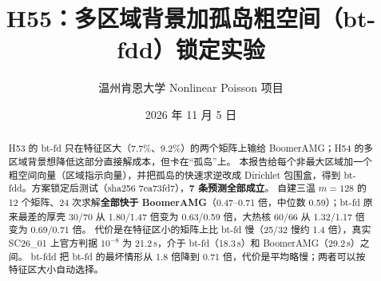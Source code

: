 \documentclass[11pt,a4paper]{ctexart}
\title{H55：多区域背景加孤岛粗空间（bt-fdd）锁定实验}
\author{温州肯恩大学 \quad Nonlinear Poisson 项目}
\date{2026 年 11 月 5 日}
\begin{document}
\maketitle
\begin{center}\end{center}

\begin{abstract}
H53 的 bt-fd 只在特征区大（7.7\%、9.2\%）的两个矩阵上输给 BoomerAMG；H54 的多区域背景想降低这部分直接解成本，但卡在“孤岛”上。
本报告给每个非最大区域加一个粗空间向量（区域指示向量），并把孤岛的快速求逆改成 Dirichlet 包围盒，得到 bt-fdd。方案锁定后测试（sha256 7ea73fd7），\textbf{7 条预测全部成立}。
自建三温 $m=128$ 的 12 个矩阵、24 次求解\textbf{全部快于 BoomerAMG}（0.47--0.71 倍，中位数 0.59）；bt-fd 原来最差的厚壳 30/70 从 1.80/1.47 倍变为 0.63/0.59 倍，大热核 60/66 从 1.32/1.17 倍变为 0.69/0.71 倍。
代价是在特征区小的矩阵上比 bt-fd 慢（25/32 慢约 1.4 倍），真实 SC26\_01 上官方判据 $10^{-8}$ 为 21.2\,s，介于 bt-fd（18.3\,s）和 BoomerAMG（29.2\,s）之间。
bt-fdd 把 bt-fd 的最坏情形从 1.8 倍降到 0.71 倍，代价是平均略慢；两者可以按特征区大小自动选择。
\end{abstract}
\end{document}
